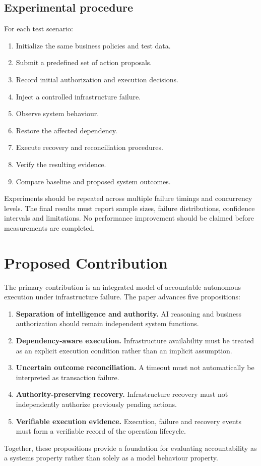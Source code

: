 \documentclass[11pt,a4paper]{article}
\begin{document}
\subsection{Experimental procedure}

For each test scenario:
\begin{enumerate}[label=\arabic*.]
  \item Initialize the same business policies and test data.
  \item Submit a predefined set of action proposals.
  \item Record initial authorization and execution decisions.
  \item Inject a controlled infrastructure failure.
  \item Observe system behaviour.
  \item Restore the affected dependency.
  \item Execute recovery and reconciliation procedures.
  \item Verify the resulting evidence.
  \item Compare baseline and proposed system outcomes.
\end{enumerate}
Experiments should be repeated across multiple failure timings and concurrency levels. The final results must report sample sizes, failure distributions, confidence intervals and limitations. No performance improvement should be claimed before measurements are completed.

\section{Proposed Contribution}

The primary contribution is an integrated model of accountable autonomous execution under infrastructure failure. The paper advances five propositions:
\begin{enumerate}[label=\textbf{C\arabic*.}]
  \item \textbf{Separation of intelligence and authority.} AI reasoning and business authorization should remain independent system functions.
  \item \textbf{Dependency-aware execution.} Infrastructure availability must be treated as an explicit execution condition rather than an implicit assumption.
  \item \textbf{Uncertain outcome reconciliation.} A timeout must not automatically be interpreted as transaction failure.
  \item \textbf{Authority-preserving recovery.} Infrastructure recovery must not independently authorize previously pending actions.
  \item \textbf{Verifiable execution evidence.} Execution, failure and recovery events must form a verifiable record of the operation lifecycle.
\end{enumerate}
Together, these propositions provide a foundation for evaluating accountability as a systems property rather than solely as a model behaviour property.
\end{document}
